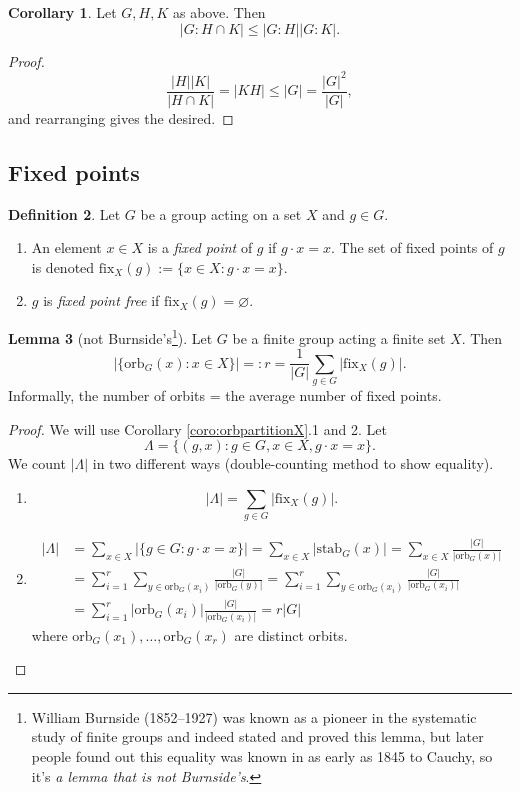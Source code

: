 \documentclass[a4paper]{article}
\newcommand{\orb}{\text{orb}}
\newcommand{\stab}{\text{stab}}
\newcommand{\fix}{\text{fix}}
\theoremstyle{definition}
\newtheorem{defn}{Definition}[subsection]
\newtheorem{lemma}[defn]{Lemma}
\newtheorem{coro}[defn]{Corollary}
\begin{document}
\begin{coro}
Let $G,H,K$ as above. Then
\[
|G:H\cap K|\leq |G:H||G:K|.
\]
\end{coro}
\begin{proof}
\[
\frac{|H||K|}{|H\cap K|}=|KH|\leq |G|=\frac{|G|^2}{|G|},
\]
and rearranging gives the desired.
\end{proof}

\subsection{Fixed points}
\begin{defn}
Let $G$ be a group acting on a set $X$ and $g\in G$.
\begin{enumerate}
\item An element $x\in X$ is a \textit{fixed point} of $g$ if $g\cdot x=x$. The set of fixed points of $g$ is denoted $\fix_X(g):=\{x\in X:g\cdot x=x\}$.
\item $g$ is \textit{fixed point free} if $\fix_X(g)=\varnothing$.
\end{enumerate}
\end{defn}

\begin{lemma}[not Burnside's\footnote{William Burnside (1852–1927) was known as a pioneer in the systematic study of finite groups and indeed stated and proved this lemma, but later people found out this equality was known in as early as 1845 to Cauchy, so it's \textit{a lemma that is not Burnside's}.}]
Let $G$ be a finite group acting a finite set $X$. Then
\[
|\{\orb_G(x):x\in X\}|=:r=\frac{1}{|G|}\sum_{g\in G}|\fix_X(g)|.
\]
Informally, the number of orbits = the average number of fixed points.
\end{lemma}
\begin{proof}
We will use Corollary \ref{coro:orbpartitionX}.1 and 2. Let
\[
\Lambda = \{(g,x):g\in G,x\in X, g\cdot x=x\}.
\]
We count $|\Lambda|$ in two different ways (double-counting method to show equality).
\begin{enumerate}
\item \[
|\Lambda|=\sum_{g\in G} |\fix_X(g)|.
\]
\item \[
\begin{aligned}
|\Lambda|&=\sum_{x\in X} |\{g\in G:g\cdot x=x\}|=\sum_{x\in X} |\stab_G(x)|=\sum_{x\in X} \frac{|G|}{|\orb_G(x)|}\\
&=\sum_{i=1}^r\sum_{y\in\orb_G(x_i)} \frac{|G|}{|\orb_G(y)|}=\sum_{i=1}^r\sum_{y\in\orb_G(x_i)} \frac{|G|}{|\orb_G(x_i)|} \\
&=\sum_{i=1}^r |\orb_G(x_i)| \frac{|G|}{|\orb_G(x_i)|}=r|G|
\end{aligned}
\]
where $\orb_G(x_1),\ldots,\orb_G(x_r)$ are distinct orbits.
\end{enumerate}
\end{proof}
\end{document}
